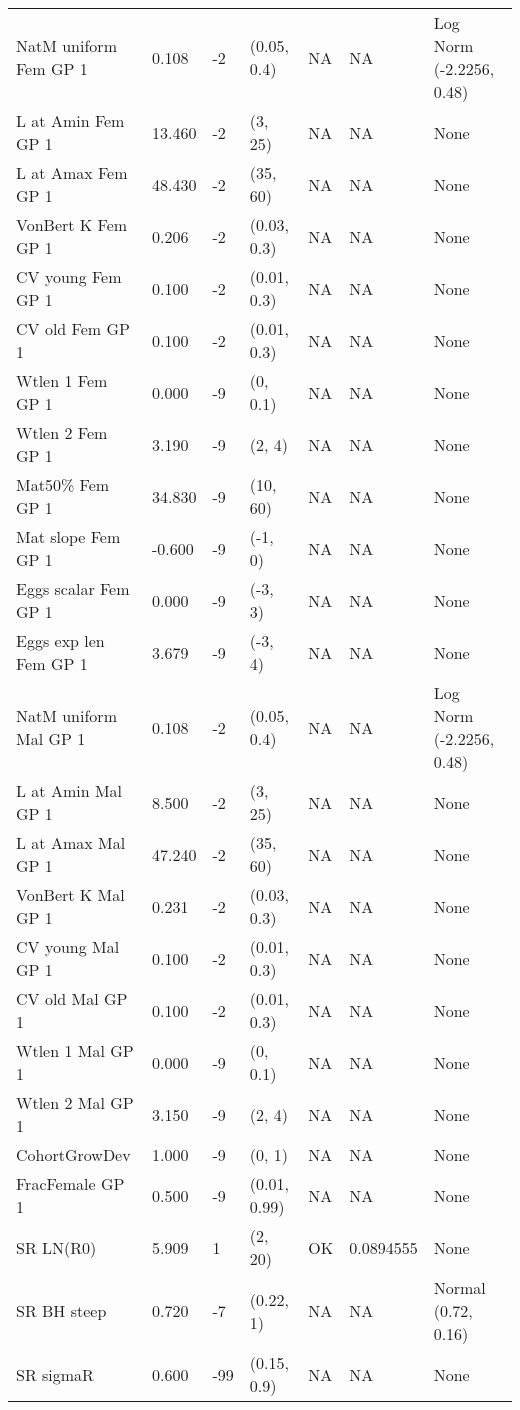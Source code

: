 \documentclass[11pt,
  english,
  letterpaper,
]{article}
\begin{document}
\begin{landscape}
\begin{longtable}[t]{>{\raggedright\arraybackslash}p{7cm}lllll>{\raggedright\arraybackslash}p{4cm}}
\endfoot
\bottomrule
\endlastfoot
NatM uniform Fem GP 1 & 0.108 & -2 & (0.05, 0.4) & NA & NA & Log Norm (-2.2256, 0.48)\\
L at Amin Fem GP 1 & 13.460 & -2 & (3, 25) & NA & NA & None\\
L at Amax Fem GP 1 & 48.430 & -2 & (35, 60) & NA & NA & None\\
VonBert K Fem GP 1 & 0.206 & -2 & (0.03, 0.3) & NA & NA & None\\
CV young Fem GP 1 & 0.100 & -2 & (0.01, 0.3) & NA & NA & None\\
CV old Fem GP 1 & 0.100 & -2 & (0.01, 0.3) & NA & NA & None\\
Wtlen 1 Fem GP 1 & 0.000 & -9 & (0, 0.1) & NA & NA & None\\
Wtlen 2 Fem GP 1 & 3.190 & -9 & (2, 4) & NA & NA & None\\
Mat50\% Fem GP 1 & 34.830 & -9 & (10, 60) & NA & NA & None\\
Mat slope Fem GP 1 & -0.600 & -9 & (-1, 0) & NA & NA & None\\
Eggs scalar Fem GP 1 & 0.000 & -9 & (-3, 3) & NA & NA & None\\
Eggs exp len Fem GP 1 & 3.679 & -9 & (-3, 4) & NA & NA & None\\
NatM uniform Mal GP 1 & 0.108 & -2 & (0.05, 0.4) & NA & NA & Log Norm (-2.2256, 0.48)\\
L at Amin Mal GP 1 & 8.500 & -2 & (3, 25) & NA & NA & None\\
L at Amax Mal GP 1 & 47.240 & -2 & (35, 60) & NA & NA & None\\
VonBert K Mal GP 1 & 0.231 & -2 & (0.03, 0.3) & NA & NA & None\\
CV young Mal GP 1 & 0.100 & -2 & (0.01, 0.3) & NA & NA & None\\
CV old Mal GP 1 & 0.100 & -2 & (0.01, 0.3) & NA & NA & None\\
Wtlen 1 Mal GP 1 & 0.000 & -9 & (0, 0.1) & NA & NA & None\\
Wtlen 2 Mal GP 1 & 3.150 & -9 & (2, 4) & NA & NA & None\\
CohortGrowDev & 1.000 & -9 & (0, 1) & NA & NA & None\\
FracFemale GP 1 & 0.500 & -9 & (0.01, 0.99) & NA & NA & None\\
SR LN(R0) & 5.909 & 1 & (2, 20) & OK & 0.0894555 & None\\
SR BH steep & 0.720 & -7 & (0.22, 1) & NA & NA & Normal (0.72, 0.16)\\
SR sigmaR & 0.600 & -99 & (0.15, 0.9) & NA & NA & None\\

\end{longtable}
\end{landscape}
\end{document}

